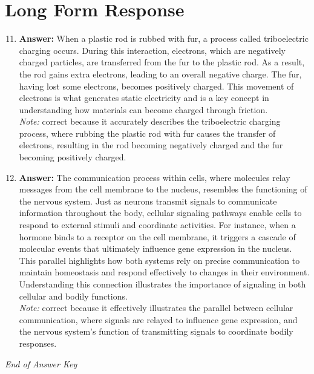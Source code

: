 \documentclass[12pt]{article}
\begin{document}
\section*{Long Form Response}
\begin{enumerate}[label=\arabic*.]
\setcounter{enumi}{10}
\item \textbf{Answer:} When a plastic rod is rubbed with fur, a process called triboelectric charging occurs. During this interaction, electrons, which are negatively charged particles, are transferred from the fur to the plastic rod. As a result, the rod gains extra electrons, leading to an overall negative charge. The fur, having lost some electrons, becomes positively charged. This movement of electrons is what generates static electricity and is a key concept in understanding how materials can become charged through friction.
\\ \textit{Note:} correct because it accurately describes the triboelectric charging process, where rubbing the plastic rod with fur causes the transfer of electrons, resulting in the rod becoming negatively charged and the fur becoming positively charged.
\item \textbf{Answer:} The communication process within cells, where molecules relay messages from the cell membrane to the nucleus, resembles the functioning of the nervous system. Just as neurons transmit signals to communicate information throughout the body, cellular signaling pathways enable cells to respond to external stimuli and coordinate activities. For instance, when a hormone binds to a receptor on the cell membrane, it triggers a cascade of molecular events that ultimately influence gene expression in the nucleus. This parallel highlights how both systems rely on precise communication to maintain homeostasis and respond effectively to changes in their environment. Understanding this connection illustrates the importance of signaling in both cellular and bodily functions.
\\ \textit{Note:} correct because it effectively illustrates the parallel between cellular communication, where signals are relayed to influence gene expression, and the nervous system's function of transmitting signals to coordinate bodily responses.
\end{enumerate}

\vfill
\noindent\textit{End of Answer Key}
\end{document}
